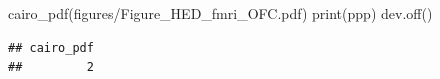 \documentclass[
]{article}
\newenvironment{Shaded}{\begin{snugshade}}{\end{snugshade}}
\newcommand{\FunctionTok}[1]{\textcolor[rgb]{0.00,0.00,0.00}{#1}}
\newcommand{\NormalTok}[1]{#1}
\newcommand{\StringTok}[1]{\textcolor[rgb]{0.31,0.60,0.02}{#1}}
\begin{document}
\begin{Shaded}
\begin{Highlighting}[]
\FunctionTok{cairo\_pdf}\NormalTok{(}\StringTok{\textquotesingle{}figures/Figure\_HED\_fmri\_OFC.pdf\textquotesingle{}}\NormalTok{)}
\FunctionTok{print}\NormalTok{(ppp)}
\FunctionTok{dev.off}\NormalTok{()}
\end{Highlighting}
\end{Shaded}

\begin{verbatim}
## cairo_pdf 
##         2
\end{verbatim}
\end{document}
